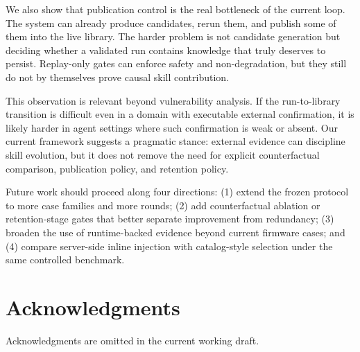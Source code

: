 ﻿\documentclass[preprint,12pt]{elsarticle}
\begin{document}
We also show that publication control is the real bottleneck of the
current loop.  The system can already produce candidates, rerun them, and
publish some of them into the live library.  The harder problem is not
candidate generation but deciding whether a validated run contains knowledge
that truly deserves to persist.  Replay-only gates can enforce safety and
non-degradation, but they still do not by themselves prove causal skill
contribution.

This observation is relevant beyond vulnerability analysis.  If the
run-to-library transition is difficult even in a domain with executable
external confirmation, it is likely harder in agent settings where such
confirmation is weak or absent.  Our current framework suggests a pragmatic
stance: external evidence can discipline skill evolution, but it does not
remove the need for explicit counterfactual comparison, publication policy,
and retention policy.

Future work should proceed along four directions: (1) extend the frozen
protocol to more case families and more rounds; (2) add counterfactual
ablation or retention-stage gates that better separate improvement from
redundancy; (3) broaden the use of runtime-backed evidence beyond current
firmware cases; and (4) compare server-side inline injection with
catalog-style selection under the same controlled benchmark.
\section*{Acknowledgments}
Acknowledgments are omitted in the current working draft.



\end{document}
